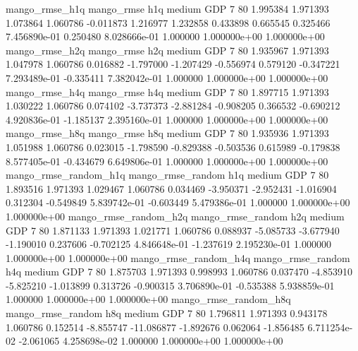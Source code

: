        mango_rmse_h1q        mango_rmse                  h1q     medium      GDP                 7 80  1.995384       1.971393 1.073864       1.060786   -0.011873      1.216977      1.232858     0.433898       0.665545  0.325466 7.456890e-01     0.250480   8.028666e-01            1.000000    1.000000e+00        1.000000e+00
       mango_rmse_h2q        mango_rmse                  h2q     medium      GDP                 7 80  1.935967       1.971393 1.047978       1.060786    0.016882     -1.797000     -1.207429    -0.556974       0.579120 -0.347221 7.293489e-01    -0.335411   7.382042e-01            1.000000    1.000000e+00        1.000000e+00
       mango_rmse_h4q        mango_rmse                  h4q     medium      GDP                 7 80  1.897715       1.971393 1.030222       1.060786    0.074102     -3.737373     -2.881284    -0.908205       0.366532 -0.690212 4.920836e-01    -1.185137   2.395160e-01            1.000000    1.000000e+00        1.000000e+00
       mango_rmse_h8q        mango_rmse                  h8q     medium      GDP                 7 80  1.935936       1.971393 1.051988       1.060786    0.023015     -1.798590     -0.829388    -0.503536       0.615989 -0.179838 8.577405e-01    -0.434679   6.649806e-01            1.000000    1.000000e+00        1.000000e+00
mango_rmse_random_h1q mango_rmse_random                  h1q     medium      GDP                 7 80  1.893516       1.971393 1.029467       1.060786    0.034469     -3.950371     -2.952431    -1.016904       0.312304 -0.549849 5.839742e-01    -0.603449   5.479386e-01            1.000000    1.000000e+00        1.000000e+00
mango_rmse_random_h2q mango_rmse_random                  h2q     medium      GDP                 7 80  1.871133       1.971393 1.021771       1.060786    0.088937     -5.085733     -3.677940    -1.190010       0.237606 -0.702125 4.846648e-01    -1.237619   2.195230e-01            1.000000    1.000000e+00        1.000000e+00
mango_rmse_random_h4q mango_rmse_random                  h4q     medium      GDP                 7 80  1.875703       1.971393 0.998993       1.060786    0.037470     -4.853910     -5.825210    -1.013899       0.313726 -0.900315 3.706890e-01    -0.535388   5.938859e-01            1.000000    1.000000e+00        1.000000e+00
mango_rmse_random_h8q mango_rmse_random                  h8q     medium      GDP                 7 80  1.796811       1.971393 0.943178       1.060786    0.152514     -8.855747    -11.086877    -1.892676       0.062064 -1.856485 6.711254e-02    -2.061065   4.258698e-02            1.000000    1.000000e+00        1.000000e+00
